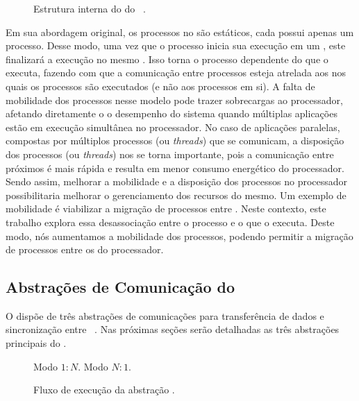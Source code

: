 \begin{figure}[t]
    \centering
    
    \caption{Estrutura interna do \microkernel do \nanvix~\cite{penna:thesis}.}
    \label{fig.microkernel-overview}
\end{figure}

Em sua abordagem original, os processos no \nanvix são estáticos, \ie cada \cluster possui apenas um processo. Desse modo, uma vez que o processo inicia sua execução em um \cluster, este finalizará a execução no mesmo \cluster. 
Isso torna o processo dependente do \cluster que o executa, fazendo com que a comunicação entre processos esteja atrelada aos \clusters nos quais os processos são executados (e não aos processos em si). A falta de mobilidade dos processos nesse modelo pode trazer sobrecargas ao processador, afetando diretamente o o desempenho do sistema quando múltiplas aplicações estão em execução simultânea no processador. No caso de aplicações paralelas, compostas por múltiplos processos (ou \textit{threads}) que se comunicam, a disposição dos processos (ou \textit{threads}) nos \clusters se torna importante, pois a comunicação entre \clusters próximos é mais rápida e resulta em menor consumo energético do processador. Sendo assim, melhorar a mobilidade e a disposição dos processos no processador possibilitaria melhorar o gerenciamento dos recursos do mesmo. Um exemplo de mobilidade é viabilizar a migração de processos entre \clusters. Neste contexto, este trabalho explora essa desassociação entre o processo e o \cluster que o executa. Deste modo, nós aumentamos a mobilidade dos processos, podendo permitir a migração de processos entre os \clusters do processador.

\subsection{Abstrações de Comunicação do \nanvix}

O \nanvix dispõe de três abstrações de comunicações para transferência de dados e sincronização entre \clusters~\cite{penna:thesis}. Nas próximas seções serão detalhadas as três abstrações principais do \nanvix.

\begin{figure}[tb]
	\centering
                   {Modo $1:N$.}
                   {}
	\qquad
                   {Modo $N:1$.}
                   {}
	\caption{Fluxo de execução da abstração \sync \cite{penna:thesis}.\label{fig.sync}}
\end{figure}

